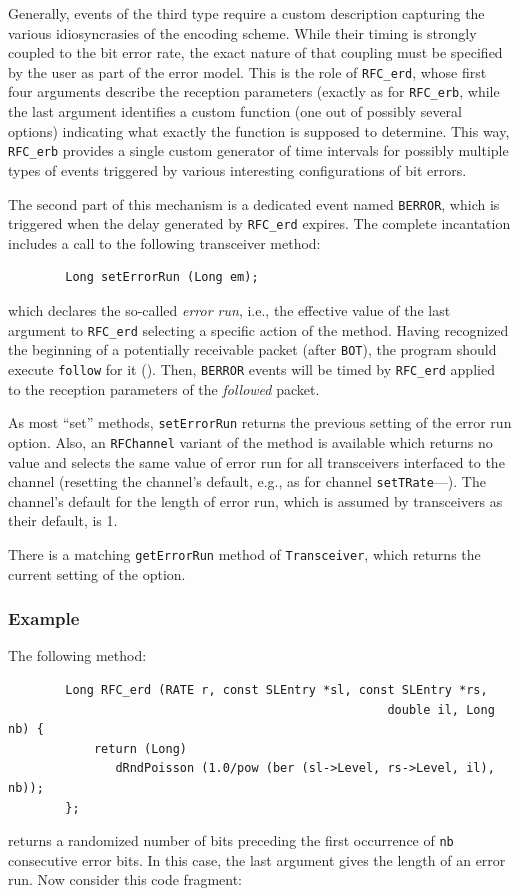 Generally, events of the third type require a custom description capturing
the various idiosyncrasies of the encoding scheme.
While their timing is strongly coupled to the bit error rate, the exact
nature of that coupling must be specified by the user as part of the 
error model.
This is the role of {\tt RFC\_erd}, whose first four arguments describe the
reception parameters (exactly as for {\tt RFC\_erb}, while the last argument
identifies a custom function (one out of possibly several options) indicating
what exactly the function is supposed to determine.
This way, {\tt RFC\_erb} provides a single custom generator of time intervals
for possibly multiple types of events triggered by various interesting
configurations of bit errors.

The second part of this mechanism is a dedicated event named {\tt BERROR},
which is triggered when the delay generated by {\tt RFC\_erd} expires.
The complete incantation includes a call to the following transceiver
method:
\begin{verbatim}
        Long setErrorRun (Long em);
\end{verbatim}
\noindent
which declares the so-called {\em error run}, i.e.,
the effective value of the last argument to {\tt RFC\_erd}
selecting a specific action of the method.
Having recognized the beginning of a potentially receivable packet (after
{\tt BOT}), the program should execute {\tt follow} for it
().
Then, {\tt BERROR} events will be timed by {\tt RFC\_erd} applied to the
reception parameters of the {\em followed\/} packet.

As most ``set'' methods, {\tt setErrorRun} returns the previous setting of
the error run option.
Also, an {\tt RFChannel} variant of the method is available which returns no value and
selects the same value of error run
for all transceivers interfaced to the channel (resetting the channel's
default, e.g., as for channel {\tt setTRate}---).
The channel's default for the length of error run, which is assumed by
transceivers as their default, is 1.

There is a matching {\tt getErrorRun} method of {\tt Transceiver}, which
returns the current setting of the option.

\subsubsection*{Example}

The following method:

\begin{verbatim}
        Long RFC_erd (RATE r, const SLEntry *sl, const SLEntry *rs,
                                                     double il, Long nb) {
            return (Long)
               dRndPoisson (1.0/pow (ber (sl->Level, rs->Level, il), nb));
        };
\end{verbatim}
returns a randomized number of bits preceding the first occurrence of {\tt nb}
consecutive error bits.
In this case, the last argument gives the length of an error run.
Now consider this code fragment:

